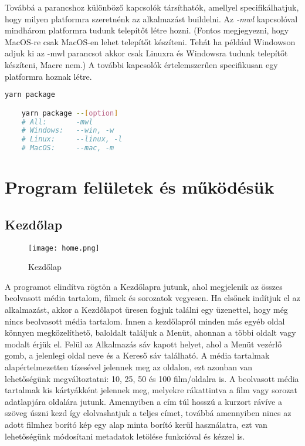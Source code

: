 Továbbá a parancshoz különböző kapcsolók társíthatók, amellyel specifikálhatjuk, hogy milyen platformra szeretnénk az alkalmazást buildelni. Az {\it -mwl} kapcsolóval mindhárom platformra tudunk telepítőt létre hozni. (Fontos megjegyezni, hogy MacOS-re csak MacOS-en lehet telepítőt készíteni. Tehát ha például Windowson adjuk ki az -mwl parancsot akkor csak Linuxra és Windowsra tudunk telepítőt készíteni, Macre nem.) A további kapcsolók értelemszerűen specifikusan egy platformra hoznak létre.
\begin{lstlisting}[language={Bash}, numbers={none}]
    yarn package

    yarn package --[option]
    # All:       -mwl
    # Windows:   --win, -w
    # Linux:     --linux, -l
    # MacOS:     --mac, -m
\end{lstlisting}

\section{Program felületek és működésük}

\subsection{Kezdőlap}
\begin{figure}[H]
	\centering
	\texttt{[image: home.png]}
	\caption{Kezdőlap}
	\label{fig:home}
\end{figure}
A programot elindítva rögtön a Kezdőlapra jutunk, ahol megjelenik az összes beolvasott média tartalom, filmek és sorozatok vegyesen. Ha elsőnek indítjuk el az alkalmazást, akkor a Kezdőlapot üresen fogjuk találni egy üzenettel, hogy még nincs beolvasott média tartalom. Innen a kezdőlapról minden más egyéb oldal könnyen megközelíthető, baloldalt találjuk a Menüt, ahonnan a többi oldalt vagy modalt érjük el. Felül az Alkalmazás sáv kapott helyet, ahol a Menüt vezérlő gomb, a jelenlegi oldal neve és a Kereső sáv található. A média tartalmak alapértelmezetten tízesével jelennek meg az oldalon, ezt azonban van lehetőségünk megváltoztatni: 10, 25, 50 és 100 film/oldalra is. A beolvasott média tartalmak kis kártyákként jelennek meg, melyekre rákattintva a film vagy sorozat adatlapjára oldalára jutunk. Amennyiben a cím túl hosszú a kurzort rávíve a szöveg úszni kezd így elolvashatjuk a teljes címet, továbbá amennyiben nincs az adott filmhez borító kép egy alap minta borító kerül használatra, ezt van lehetőségünk módosítani metadatok letölése funkcióval és kézzel is.

